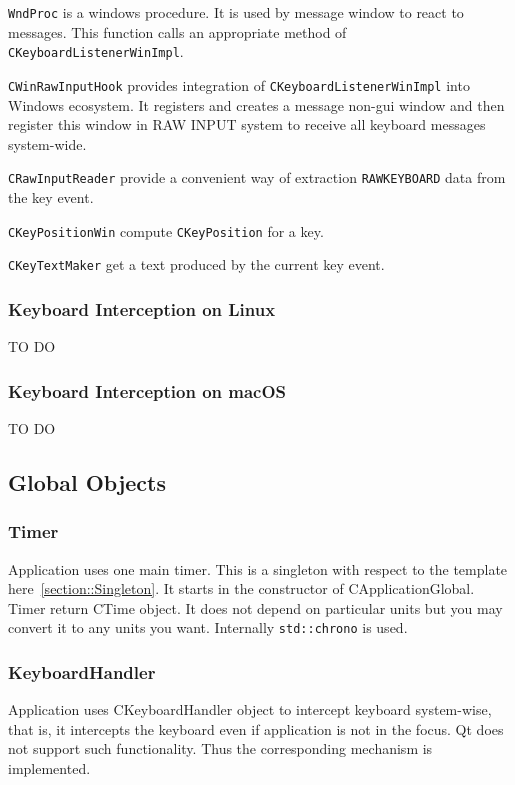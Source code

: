 \documentclass{article}
\begin{document}
\verb"WndProc" is a windows procedure. It is used by message window to react to messages. This function calls an appropriate method of \verb"CKeyboardListenerWinImpl".

\verb"CWinRawInputHook" provides integration of \verb"CKeyboardListenerWinImpl" into Windows ecosystem. It registers and creates a message non-gui window and then register this window in RAW INPUT system to receive all keyboard messages system-wide.

\verb"CRawInputReader" provide a convenient way of extraction \verb"RAWKEYBOARD" data from the key event.

\verb"CKeyPositionWin" compute \verb"CKeyPosition" for a key.

\verb"CKeyTextMaker" get a text produced by the current key event.

\subsubsection{Keyboard Interception on Linux}

TO DO

\subsubsection{Keyboard Interception on macOS}

TO DO

\subsection{Global Objects}

\subsubsection{Timer}

Application uses one main timer. This is a singleton with respect to the template here~\ref{section::Singleton}. It starts in the constructor of CApplicationGlobal. Timer return CTime object. It does not depend on particular units but you may convert it to any units you want. Internally \verb"std::chrono" is used.

\subsubsection{KeyboardHandler}\label{section::KeyboardHandler}

Application uses CKeyboardHandler object to intercept keyboard system-wise, that is, it intercepts the keyboard even if application is not in the focus. Qt does not support such functionality. Thus the corresponding mechanism is implemented.
\end{document}

